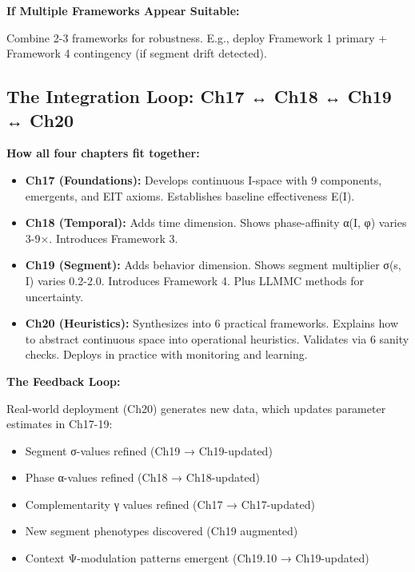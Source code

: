 \begin{center}
{\begin{minipage}{14cm}
\vspace{0.3cm}
\textbf{If Multiple Frameworks Appear Suitable:}

Combine 2-3 frameworks for robustness. E.g., deploy Framework 1 primary + Framework 4 contingency (if segment drift detected).

\end{minipage}}
\end{center}

\subsection{The Integration Loop: Ch17 ↔ Ch18 ↔ Ch19 ↔ Ch20}

\textbf{How all four chapters fit together:}

\begin{itemize}[nosep]
\item \textbf{Ch17 (Foundations):} Develops continuous I-space with 9 components, emergents, and EIT axioms. Establishes baseline effectiveness E(I).

\item \textbf{Ch18 (Temporal):} Adds time dimension. Shows phase-affinity α(I, φ) varies 3-9×. Introduces Framework 3.

\item \textbf{Ch19 (Segment):} Adds behavior dimension. Shows segment multiplier σ(s, I) varies 0.2-2.0. Introduces Framework 4. Plus LLMMC methods for uncertainty.

\item \textbf{Ch20 (Heuristics):} Synthesizes into 6 practical frameworks. Explains how to abstract continuous space into operational heuristics. Validates via 6 sanity checks. Deploys in practice with monitoring and learning.

\end{itemize}

\textbf{The Feedback Loop:}

Real-world deployment (Ch20) generates new data, which updates parameter estimates in Ch17-19:
\begin{itemize}[nosep]
\item Segment σ-values refined (Ch19 → Ch19-updated)
\item Phase α-values refined (Ch18 → Ch18-updated)
\item Complementarity γ values refined (Ch17 → Ch17-updated)
\item New segment phenotypes discovered (Ch19 augmented)
\item Context Ψ-modulation patterns emergent (Ch19.10 → Ch19-updated)
\end{itemize}

